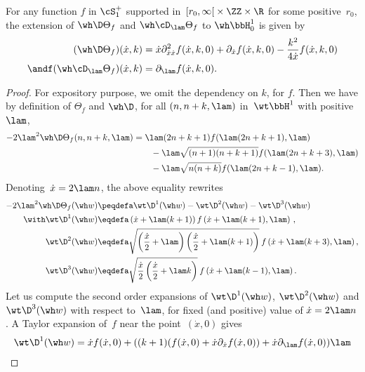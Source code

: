 \begin{prop}\label{whDeltaover0}
For any function $f$ in $\cS_1^+$ supported in~$[r_0,\infty\mathclose{[}\times \ZZ\times\R$ for some positive~$r_0$, the extension of $\wh \D \Theta_f$ and $\wh \cD_\lam \Theta_f$ to $\wh\bbH^1_0$ is given by
\[
\begin{aligned}
(\wh \D \Theta_f)(\dot x, k)&= \dot x\partial^2_{\dot x\dot x}f(\dot x,k,0)+\partial_{\dot x}f(\dot x,k,0) -\frac{k^2}{4\dot x}f(\dot x,k,0)\\ \andf
(\wh \cD_\lam \Theta_f)(\dot x, k)&= \partial_\lam f(\dot x,k,0).
\end{aligned}
\]
\end{prop}

\begin{proof}
For expository purpose, we omit the dependency on $k$, for $f$. Then we have by definition of $\Theta_f$ and $\wh\D$, for all $(n,n+k,\lam)$ in~$\wt\bbH^1$ with positive~$\lam$,
\begin{align*}
-2\lam^2\wh\D\Theta_f(n,n+k,\lam)
&=\lam(2n+k+1)f(\lam(2n+k+1),\lam)\\
&\qquad -\lam\sqrt{(n+1)(n+k+1)}f(\lam(2n+k+3),\lam)\\
&\qquad -\lam\sqrt{n(n+k)} f(\lam(2n+k-1),\lam).
\end{align*}
Denoting~$\dot x= 2\lam n$, the above equality rewrites
\begin{equation}\label{whDeltaover0demoeq1}
\begin{aligned}
-2\lam^2\wh \D \Theta_f (\wh w) & \peqdefa \wt \D^1(\wh w)-\wt \D^2(\wh w)-\wt \D^3(\wh w) \\ \with
\wt \D^1 (\wh w)& \eqdefa \left(\dot x+\lam(k+1)\right) f\left (\dot x+\lam (k+1),\lam\right)\,,
\\
\wt \D^2 (\wh w)& \eqdefa
\sqrt{\left(\frac {\dot x} 2 + \lam\right)\left(\frac {\dot x} 2 + \lam(k+1)\right)}
\:f\left (\dot x+\lam (k+3),\lam\right),\\
\wt \D^3 (\wh w)& \eqdefa
\sqrt{\frac {\dot x} 2\left(\frac {\dot x} 2 + \lam k\right)} \:f\left (\dot x+\lam (k-1),\lam\right).
\end{aligned}
\end{equation}
Let us compute the second order expansions of $\wt \D^1(\wh w)$, $\wt \D^2(\wh w)$ and $\wt \D^3(\wh w)$ with respect to~$\lam$, for fixed (and positive) value of $\dot x= 2\lam n$. A Taylor expansion of~$f$ near the point~$(\dot x,0)$ gives
\begin{multline}\label{whDeltaover0demoeq1bis}
\wt \D^1 (\wh w)= \dot x f(\dot x,0) + ((k+1)(f(\dot x,0)+\dot x\partial_{\dot x}f(\dot x,0)) +\dot x\partial_{\lam}f(\dot x,0))\lam \\

\end{multline}
\end{proof}
